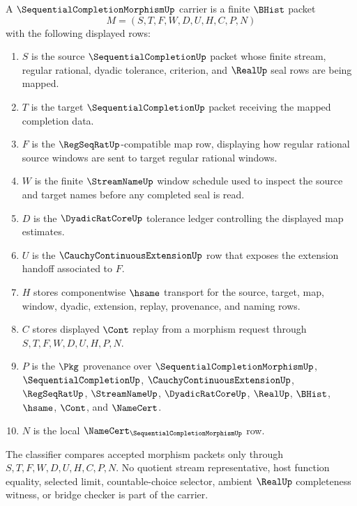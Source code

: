 \begin{definition}
\label{def:sequential-completion-morphism-carrier}
A $\SequentialCompletionMorphismUp$ carrier is a finite $\BHist$ packet
$$
M=(S,T,F,W,D,U,H,C,P,N)
$$
with the following displayed rows:
\begin{enumerate}
\item $S$ is the source $\SequentialCompletionUp$ packet whose finite stream, regular rational, dyadic tolerance, criterion, and $\RealUp$ seal rows are being mapped.
\item $T$ is the target $\SequentialCompletionUp$ packet receiving the mapped completion data.
\item $F$ is the $\RegSeqRatUp$-compatible map row, displaying how regular rational source windows are sent to target regular rational windows.
\item $W$ is the finite $\StreamNameUp$ window schedule used to inspect the source and target names before any completed seal is read.
\item $D$ is the $\DyadicRatCoreUp$ tolerance ledger controlling the displayed map estimates.
\item $U$ is the $\CauchyContinuousExtensionUp$ row that exposes the extension handoff associated to $F$.
\item $H$ stores componentwise $\hsame$ transport for the source, target, map, window, dyadic, extension, replay, provenance, and naming rows.
\item $C$ stores displayed $\Cont$ replay from a morphism request through $S,T,F,W,D,U,H,P,N$.
\item $P$ is the $\Pkg$ provenance over $\SequentialCompletionMorphismUp$, $\SequentialCompletionUp$, $\CauchyContinuousExtensionUp$, $\RegSeqRatUp$, $\StreamNameUp$, $\DyadicRatCoreUp$, $\RealUp$, $\BHist$, $\hsame$, $\Cont$, and $\NameCert$.
\item $N$ is the local $\NameCert_{\SequentialCompletionMorphismUp}$ row.
\end{enumerate}
The classifier compares accepted morphism packets only through $S,T,F,W,D,U,H,C,P,N$. No quotient stream representative, host function equality, selected limit, countable-choice selector, ambient $\RealUp$ completeness witness, or bridge checker is part of the carrier.
\end{definition}

